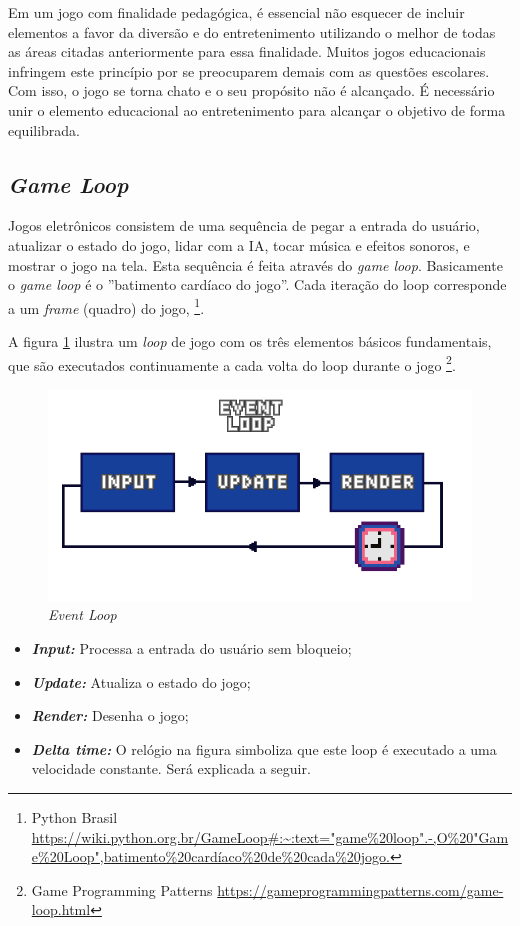 Em um jogo com finalidade pedagógica, é essencial não esquecer de incluir elementos a favor da diversão e do entretenimento utilizando o melhor de todas as áreas citadas anteriormente para essa finalidade. Muitos jogos educacionais infringem este princípio por se preocuparem demais com as questões escolares. Com isso, o jogo se torna chato e o seu propósito não é alcançado. É necessário unir o elemento educacional ao entretenimento para alcançar o objetivo de forma equilibrada.

\subsection{\textit{Game Loop}}
\label{sec:game-loop}
Jogos eletrônicos consistem de uma sequência de pegar a entrada do usuário, atualizar o estado do jogo, lidar com a IA, tocar música e efeitos sonoros, e mostrar o jogo na tela. Esta sequência é feita através do \textit{game loop}. Basicamente o \textit{game loop} é o ''batimento cardíaco do jogo''. Cada iteração do loop corresponde a um \textit{frame} (quadro) do jogo, \footnote{Python Brasil \url{https://wiki.python.org.br/GameLoop#:~:text="game%20loop".-,O%20"Game%20Loop",batimento%20cardíaco%20de%20cada%20jogo.}}.

A figura \ref{fig:event-loop} ilustra um \textit{loop} de jogo com os três elementos básicos fundamentais, que são executados continuamente a cada volta do loop durante o jogo \footnote{Game Programming Patterns \url{https://gameprogrammingpatterns.com/game-loop.html}}.


\begin{figure}[h!]
    \centering
    \includegraphics[width=1\linewidth]{figuras/event-loop.png}
    \caption{\textit{Event Loop}}
    \label{fig:event-loop}
\end{figure}

\begin{itemize}
    \item \textit{\textbf{Input:}} Processa a entrada do usuário sem bloqueio;
    \item \textit{\textbf{Update:}} Atualiza o estado do jogo;
    \item \textit{\textbf{Render:}}  Desenha o jogo;
    \item \textit{\textbf{Delta time:}} O relógio na figura simboliza que este loop é executado a uma velocidade constante. Será explicada a seguir. 
\end{itemize}

